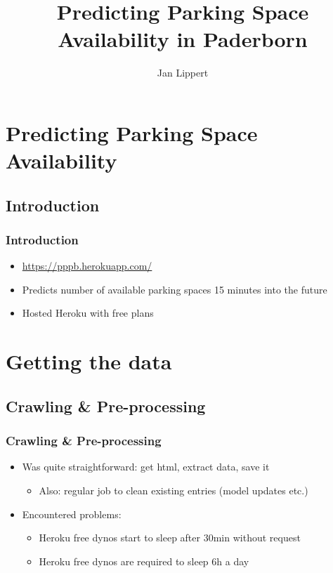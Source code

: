 \documentclass[11pt]{beamer}
\begin{document}
\author{Jan Lippert}
\title{Predicting Parking Space Availability in Paderborn}
\frame[plain]{\maketitle}



\section{Predicting Parking Space Availability}
\subsection{Introduction}
\begin{frame}
  \frametitle{Introduction}
  \begin{itemize}
  	\item \url{https://pppb.herokuapp.com/}
  	\item Predicts number of available parking spaces 15 minutes into the future
  	\item Hosted Heroku with free plans
  \end{itemize}
\end{frame}

\section{Getting the data}
\subsection{Crawling \& Pre-processing}
\begin{frame}
  \frametitle{Crawling \& Pre-processing}
  \begin{itemize}
  	\item Was quite straightforward: get html, extract data, save it
    \begin{itemize}
      \item Also: regular job to clean existing entries (model updates etc.)
    \end{itemize}
  	\item Encountered problems: 
  	\begin{itemize}
  	  \item Heroku free dynos start to sleep after 30min without request
  	  \item Heroku free dynos are required to sleep 6h a day
  	\end{itemize}
  \end{itemize}
\end{frame}
\end{document}
